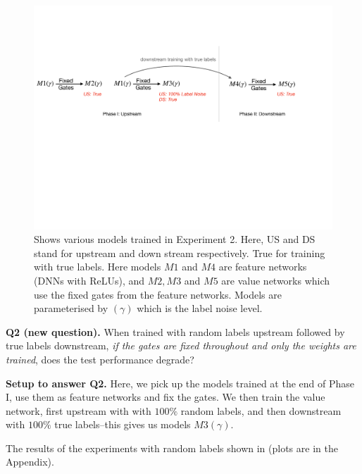 \begin{figure}[t]
\centering
\includegraphics[scale=0.25]{figs/rand-label-big.pdf}
\caption{\small Shows various models trained in Experiment 2. Here, US and DS stand for upstream and down stream respectively. True for training with true labels. Here models $M1$ and $M4$ are feature networks (DNNs with ReLUs), and $M2, M3$ and $M5$ are value networks which use the fixed gates from the feature networks. Models are parameterised by $(\gamma)$ which is the label noise level.}
\label{fig:rand-label-setup}
\end{figure}


\textbf{Q2 (new question).} {When trained with random labels upstream followed by true labels downstream, \emph{if the gates are fixed throughout and only the weights are trained}, does the test performance degrade?}

\textbf{Setup to answer Q2.} Here, we pick up the models trained at the end of Phase I, use them as feature networks and fix the gates. We then train the value network, first upstream with with $100\%$ random labels, and then downstream with $100\%$ true labels--this gives us models $M3(\gamma)$.

The results of the experiments with random labels shown in  (plots are in the Appendix).

